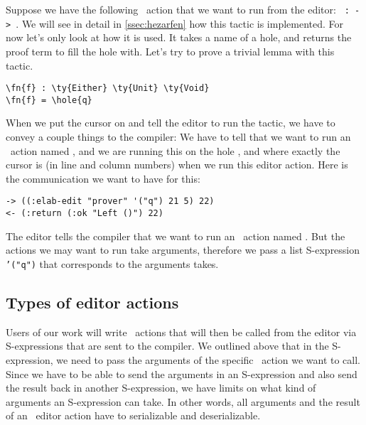 Suppose we have the following \Elab\ action that we want to run from the editor:
\texttt{ :  ->  }.
We will see in detail in \autoref{ssec:hezarfen} how this tactic is
implemented. For now let's only look at how it is used. It takes a name of a
hole, and returns the proof term to fill the hole with.
Let's try to prove a trivial lemma with this tactic.

\begin{Verbatim}[framesep=2mm, label=\footnotesize{\normalfont{Idris}}, labelposition=topline]
\fn{f} : \ty{Either} \ty{Unit} \ty{Void}
\fn{f} = \hole{q}
\end{Verbatim}

When we put the cursor on  and tell the editor to run the 
tactic, we have to convey a couple things to the compiler: We have to tell that
we want to run an \Elab\ action named , and we are running this on
the hole , and where exactly the cursor is (in line and column numbers)
when we run this editor action. Here is the communication we want to have for this:

\begin{Verbatim}[framesep=2mm, label=\footnotesize{\normalfont{S-expression}}, labelposition=topline]
-> ((:elab-edit "prover" '("q") 21 5) 22)
<- (:return (:ok "Left ()") 22)
\end{Verbatim}

The editor tells the compiler that we want to run an \Elab\ action named
. But the actions we may want to run take arguments, therefore we
pass a list S-expression \texttt{'("q")} that corresponds to the arguments
 takes.

\subsection{Types of editor actions}\label{ssec:types}

Users of our work will write \Elab\ actions that will then be called from the
editor via S-expressions that are sent to the compiler. We outlined above that
in the S-expression, we need to pass the arguments of the specific
\Elab\ action we want to call. Since we have to be able to send the arguments
in an S-expression and also send the result back in another S-expression, we
have limits on what kind of arguments an S-expression can take.
In other words, all arguments and the result of an \Elab\ editor action
have to serializable and deserializable.

